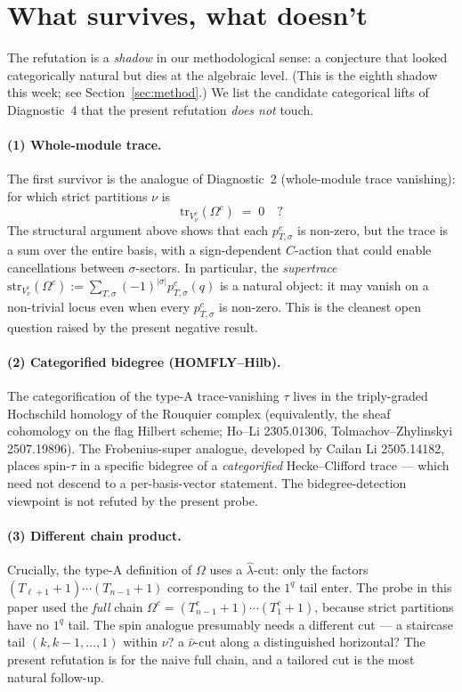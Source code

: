 \documentclass[11pt]{article}
\newcommand{\Om}{\Omega}
\newcommand{\Omc}{\Om^{c}}
\newcommand{\Tc}{T^{c}}
\newcommand{\tr}{\mathrm{tr}}
\newcommand{\str}{\mathrm{str}}
\begin{document}
\section{What survives, what doesn't}

The refutation is a \emph{shadow} in our methodological sense: a conjecture
that looked categorically natural but dies at the algebraic level. (This
is the eighth shadow this week; see Section~\ref{sec:method}.) We list the
candidate categorical lifts of Diagnostic~4 that the present refutation
\emph{does not} touch.

\paragraph{(1) Whole-module trace.}
The first survivor is the analogue of Diagnostic~2 (whole-module trace
vanishing): for which strict partitions $\nu$ is
\[
\tr_{V^{c}_{\nu}}(\Omc) \;=\; 0 \quad ?
\]
The structural argument above shows that each $p^{c}_{T,\sigma}$ is
non-zero, but the trace is a sum over the entire basis, with a
sign-dependent $C$-action that could enable cancellations between
$\sigma$-sectors. In particular, the \emph{supertrace}
$\str_{V^{c}_{\nu}}(\Omc) := \sum_{T,\sigma} (-1)^{|\sigma|}
p^{c}_{T,\sigma}(q)$ is a natural object: it may vanish on a
non-trivial locus even when every $p^{c}_{T,\sigma}$ is non-zero. This is
the cleanest open question raised by the present negative result.

\paragraph{(2) Categorified bidegree (HOMFLY--Hilb).}
The categorification of the type-A trace-vanishing $\tau$ lives in the
triply-graded Hochschild homology of the Rouquier complex
(equivalently, the sheaf cohomology on the flag Hilbert scheme; Ho--Li
2305.01306, Tolmachov--Zhylinskyi 2507.19896). The Frobenius-super
analogue, developed by Cailan Li 2505.14182, places spin-$\tau$ in a
specific bidegree of a \emph{categorified} Hecke--Clifford trace --- which
need not descend to a per-basis-vector statement. The bidegree-detection
viewpoint is not refuted by the present probe.

\paragraph{(3) Different chain product.}
Crucially, the type-A definition of $\Om$ uses a $\hat\lambda$-cut: only the
factors $(T_{\ell+1}+1) \cdots (T_{n-1}+1)$ corresponding to the $1^{q}$ tail
enter. The probe in this paper used the \emph{full} chain $\Omc =
(\Tc_{n-1}+1) \cdots (\Tc_{1}+1)$, because strict partitions have no
$1^{q}$ tail. The spin analogue presumably needs a different cut --- a
staircase tail $(k, k-1, \dots, 1)$ within $\nu$? a $\hat\nu$-cut along a
distinguished horizontal? The present refutation is for the naive full
chain, and a tailored cut is the most natural follow-up.
\end{document}
